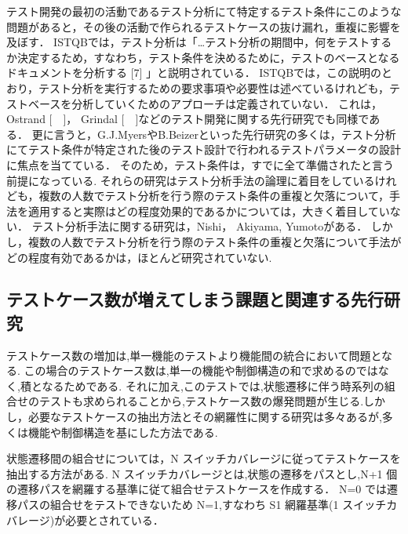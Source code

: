 \documentclass[a4paper,11pt]{jreport}
\begin{document}
テスト開発の最初の活動であるテスト分析にて特定するテスト条件にこのような問題があると，その後の活動で作られるテストケースの抜け漏れ，重複に影響を及ぼす．
ISTQBでは，テスト分析は「…テスト分析の期間中，何をテストするか決定するため，すなわち，テスト条件を決めるために，テストのベースとなるドキュメントを分析する [7] 」と説明されている．
ISTQBでは，この説明のとおり，テスト分析を実行するための要求事項や必要性は述べているけれども，テストベースを分析していくためのアプローチは定義されていない．
これは，Ostrand [　]， Grindal [　]などのテスト開発に関する先行研究でも同様である．
更に言うと，G.J.MyersやB.Beizerといった先行研究の多くは，テスト分析にてテスト条件が特定された後のテスト設計で行われるテストパラメータの設計に焦点を当てている．
そのため，テスト条件は，すでに全て準備されたと言う前提になっている.
それらの研究はテスト分析手法の論理に着目をしているけれども，複数の人数でテスト分析を行う際のテスト条件の重複と欠落について，手法を適用すると実際はどの程度効果的であるかについては，大きく着目していない．
テスト分析手法に関する研究は，Nishi\cite{nishi2012based}， Akiyama\cite{Akiyama2014}, Yumoto\cite{yumoto2013test}がある．
しかし，複数の人数でテスト分析を行う際のテスト条件の重複と欠落について手法がどの程度有効であるかは，ほとんど研究されていない.

\subsection{テストケース数が増えてしまう課題と関連する先行研究}
テストケース数の増加は,単一機能のテストより機能間の統合において問題となる.
この場合のテストケース数は,単一の機能や制御構造の和で求めるのではなく,積となるためである.
それに加え,このテストでは,状態遷移に伴う時系列の組合せのテストも求められることから,テストケース数の爆発問題が生じる.しかし，必要なテストケースの抽出方法とその網羅性に関する研究は多々あるが,多くは機能や制御構造を基にした方法である.\cite{myers2011art}

状態遷移間の組合せについては，N スイッチカバレージに従ってテストケースを抽出する方法がある. \cite{beiz90}
N スイッチカバレージとは,状態の遷移をパスとし,N+1 個の遷移パスを網羅する基準に従て組合せテストケースを作成する．
N=0 では遷移パスの組合せをテストできないため N=1,すなわち S1 網羅基準(1 スイッチカバレージ)が必要とされている．
\end{document}
